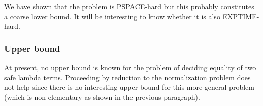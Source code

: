 We have shown that the problem is PSPACE-hard but this probably
constitutes a coarse lower bound. It will be interesting to know
whether it is also EXPTIME-hard.



\subsubsection{Upper bound}
At present, no upper bound is known for the problem of deciding
equality of two safe lambda terms. Proceeding by reduction to the
normalization problem does not help since there is no interesting
upper-bound for this more general problem (which is non-elementary
as shown in the previous paragraph).
